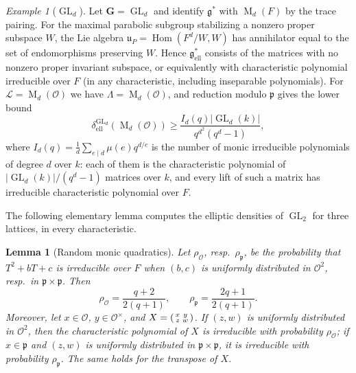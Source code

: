 \documentclass[11pt,reqno]{amsart}
\numberwithin{equation}{section}
\theoremstyle{plain}
\newtheorem{lemma}[theorem]{Lemma}
\theoremstyle{definition}
\theoremstyle{remark}
\newtheorem{example}[theorem]{Example}
\theoremstyle{plain}
\newcommand{\OO}{\mathcal{O}}    %
\newcommand{\pp}{\mathfrak{p}}   %
\newcommand{\Lat}{\mathcal{L}}   %
\newcommand{\dLat}{\Lambda}      %
\newcommand{\bG}{\mathbf{G}}     %
\newcommand{\g}{\mathfrak{g}}    %
\newcommand{\gd}{\mathfrak{g}^*} %
\newcommand{\uu}{\mathfrak{u}}   %
\newcommand{\Ell}[2][]{#2_{#1\mathrm{ell}}}   %
\newcommand{\elld}[2][]{\delta_{\mathrm{ell}}^{#1}(#2)}  %
\newcommand{\abs}[1]{\lvert#1\rvert}
\DeclareMathOperator{\Hom}{Hom}
\DeclareMathOperator{\GL}{GL}
\DeclareMathOperator{\Mat}{M}
\begin{document}
\begin{example}[$\GL_d$]\label{ex:gld}
Let $\bG=\GL_d$ and identify $\gd$ with $\Mat_d(F)$ by the trace
pairing. For the maximal parabolic subgroup stabilizing a nonzero
proper subspace $W$, the Lie algebra $\uu_P=\Hom(F^d/W,W)$ has
annihilator equal to the set of endomorphisms preserving $W$.
Hence $\Ell{\gd}$ consists of the matrices with no nonzero proper
invariant subspace, or equivalently with characteristic polynomial
irreducible over $F$ (in any characteristic, including inseparable
polynomials). For $\Lat=\Mat_d(\OO)$ we have $\dLat=\Mat_d(\OO)$, and
reduction modulo $\pp$ gives the lower bound
\[
\elld[\GL_d]{\Mat_d(\OO)}\ge\frac{I_d(q)\abs{\GL_d(k)}}{q^{d^2}(q^d-1)},
\]
where $I_d(q)=\frac1d\sum_{e\mid d}\mu(e)q^{d/e}$ is the number of
monic irreducible polynomials of degree $d$ over $k$: each of them is
the characteristic polynomial of $\abs{\GL_d(k)}/(q^d-1)$ matrices over
$k$, and every lift of such a matrix has irreducible characteristic
polynomial over $F$.
\end{example}

The following elementary lemma computes the elliptic densities of
$\GL_2$ for three lattices, in every characteristic.
\begin{lemma}[Random monic quadratics]\label{lem:quadratics}
Let $\rho_{\OO}$, resp.\ $\rho_{\pp}$, be the probability that
$T^2+bT+c$ is irreducible over $F$ when $(b,c)$ is uniformly distributed
in $\OO^2$, resp.\ in $\pp\times\pp$. Then
\[
\rho_{\OO}=\frac{q+2}{2(q+1)},\qquad\rho_{\pp}=\frac{2q+1}{2(q+1)}.
\]
Moreover, let $x\in\OO$, $y\in\OO^\times$, and
$X=\begin{psmallmatrix}x&y\\z&w\end{psmallmatrix}$. If $(z,w)$ is uniformly
distributed in $\OO^2$, then the characteristic polynomial of $X$ is
irreducible with probability $\rho_{\OO}$; if $x\in\pp$ and $(z,w)$ is
uniformly distributed in $\pp\times\pp$, it is irreducible with probability
$\rho_{\pp}$. The same holds for the transpose of $X$.
\end{lemma}
\end{document}

